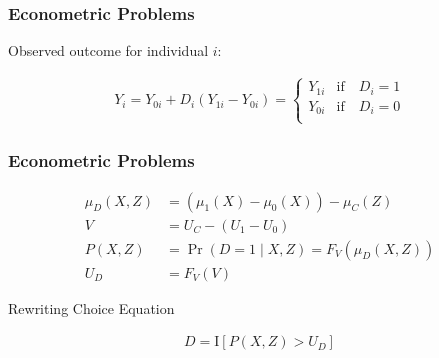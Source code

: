 \begin{frame}
\frametitle{Econometric Problems}

Observed outcome for individual \(i\):

\begin{align*}
Y_i = Y_{0i} + D_i (Y_{1i} - Y_{0i}) =
\begin{cases}
Y_{1i} & \text{if}\quad D_i = 1 \\
Y_{0i} & \text{if}\quad D_i = 0 \\
\end{cases}
\end{align*}

\end{frame}


\begin{frame}
\frametitle{Econometric Problems}

\begin{align*}
\mu_D(X, Z) & = (\mu_1(X) - \mu_0(X)) - \mu_C(Z) \\
V & = U_C - (U_1 - U_0) \\
P(X, Z) & = \Pr(D = 1 \mid X, Z)  = F_V(\mu_D(X, Z)) \\
U_D & = F_V(V)
\end{align*}

Rewriting Choice Equation

\begin{align*}
D = \mathrm{I}[P(X,Z) > U_D]
\end{align*}

\end{frame}


